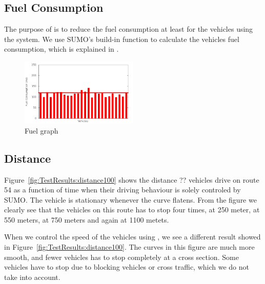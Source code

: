 %
%
%
\subsection{Fuel Consumption}
The purpose of \tech is to reduce the fuel consumption at least for the vehicles using the system. 
We use SUMO's build-in function to calculate the vehicles fuel consumption, which is explained in \cite{SUMOFuel}.

%

\begin{figure}[htb]
\includegraphics[width=0.5\textwidth]{images/tp0/fuelRouteControlled100.png}
\caption{Fuel graph}
\label{fig:TestResults:fuelRoute}
\end{figure}

\subsection{Distance}
Figure~\ref{fig:TestResults:distance100} shows the distance ?? vehicles drive on route 54 as a function of time when their driving behaviour is solely controled by SUMO. 
The vehicle is stationary whenever the curve flatens.
From the figure we clearly see that the vehicles on this route has to stop four times, at 250 meter, at 550 meters, at 750 meters and again at 1100 metets.

When we control the speed of the vehicles using \tech, we see a different result showed in Figure~\ref{fig:TestResults:distance100}.
The curves in this figure are much more smooth, and fewer vehicles has to stop completely at a cross section.
Some vehicles have to stop due to blocking vehicles or cross traffic, which we do not take into account.

